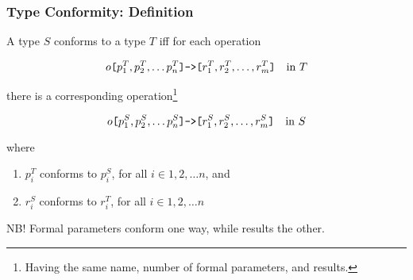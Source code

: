\begin{frame}[fragile]

\frametitle{Type Conformity: Definition}

\newcommand{\emlbr}{\ensuremath{\text{\texttt{[}}}}
\newcommand{\emrbr}{\ensuremath{\text{\texttt{]}}}}
\newcommand{\emrarr}{\ensuremath{\text{\texttt{->}}}}
\newcommand{\emsig}[3]{\ensuremath{#1\emlbr {#2}\emrbr\emrarr\emlbr {#3}\emrbr}}

A type $S$ conforms to a type $T$ iff for each operation

$$\emsig{o}{p^T_1, p^T_2, \ldots p^T_n}{r^T_1, r^T_2, \ldots,
r^T_m}\quad \text{in}\ T$$

there is a corresponding operation\footnote{Having the same name,
number of formal parameters, and results.}

$$\emsig{o}{p^S_1, p^S_2, \ldots p^S_n}{r^S_1, r^S_2, \ldots,
r^S_m}\quad \text{in}\ S$$

where

\begin{enumerate}

\item $p^T_i$ conforms to $p^S_i$, for all $i \in 1, 2, \ldots n$, and

\item $r^S_i$ conforms to $r^T_i$, for all $i \in 1, 2, \ldots n$

\end{enumerate}

\vspace{\fill}

\begin{center}

NB! Formal parameters conform one way, while results the other.

\end{center}

\end{frame}


